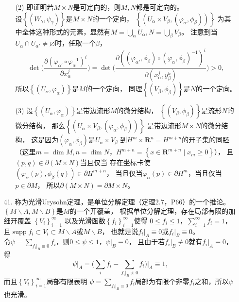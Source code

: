 \begin{itemize}
\begin{enumerate}
    \item[(2)] 即证明若$M\times N$是可定向的，则$M,N$都是可定向的。
    \\
    设$\left\{(W_\gamma,\psi_\gamma)\right\}$是$M\times N$的一个定向，
    $\left\{(U_\alpha\times V_\beta,(\varphi_\alpha,\phi_\beta))\right\}$
    为其中全体这种形式的元素，显然有$M=
    \bigcup\limits_{\alpha}U_\alpha,N=\bigcup\limits_{\beta}V_\beta$。
    注意到当$U_\alpha\cap U_{\alpha'}\neq\varnothing$时，任取一个$\beta$，
    $$\det\Big(\frac{\partial(\varphi_{\alpha'}
    \circ\varphi_\alpha^{-1})^{i}}{\partial x_{\alpha}^j}\Big)
    =\det\Big(\frac{\partial((\varphi_{\alpha'},\phi_\beta)
    \circ(\varphi_\alpha,\phi_\beta)^{-1})^{i}}
    {\partial(x_\alpha^j,y_\beta^k)}\Big)>0,$$
    所以$\left\{(U_\alpha,\varphi_\alpha)\right\}$是$M$的一个定向，
    同理$\left\{(V_\beta,\phi_\beta)\right\}$是$N$的一个定向。
    
    \item[(3)] 设$\left\{(U_\alpha,\varphi_\alpha)\right\}$是带边流形$M$的微分结构，
    $\left\{(V_\beta,\phi_\beta)\right\}$是流形$N$的微分结构，
    那么$\left\{(U_\alpha\times V_\beta,(\varphi_\alpha,\phi_\beta))\right\}$
    是带边流形$M\times N$的微分结构，
    这是因为$(\varphi_\alpha,\phi_\beta)$是$U_\alpha\times V_\beta$
    到$H^m\times\mathbf{R}^n=H^{m+n}$的开子集的同胚
    （这里$m=\dim M,n=\dim N$，$H^{m+n}=\left\{x\in\mathbf{R}^{m+n}\mid x_m\geq0\right\}$），
    且$(p,q)\in\partial(M\times N)$当且仅当
    存在坐标卡使$(\varphi_\alpha(p),\phi_\beta(q))\in\partial H^{m+n}$，
    当且仅当$\varphi_\alpha(p)\in\partial H^m$，当且仅当$p\in\partial M$，
    所以$\partial(M\times N)= \partial M\times N$。
    \end{enumerate}

    \item[41.]
    称为光滑Urysohn定理，是单位分解定理（定理2.7，P66）的一个推论。
    \\
    $\left\{M\backslash A,M\backslash B\right\}$是$M$的一个开覆盖，
    根据单位分解定理，存在局部有限的加细开覆盖
    $\left\{V_i\right\}_{i=1}^\infty$
    以及光滑函数$\left\{f_i\right\}_{i=1}^\infty$使得
    $0\leq f_i\leq1$，$\sum\limits_{i=1}^\infty f_i=1$，
    且$\operatorname{supp}f_i\subset V_i\subset M\backslash A$或$M\backslash B$，
    也就是说$f_i|_A\equiv0$或$f_i|_B\equiv0$。
    \\
    令$\psi=\sum\limits_{f_i|_B\equiv0}f_i$，则$0\leq\psi\leq1$，$\psi|_B\equiv0$，
    且由于若$f_i|_B\not\equiv0$就有$f_i|_A\equiv0$，
    得
    \[
    \psi|_A=\Big(\sum_i f_i-\sum_{f_i|_B\not\equiv0}f_i\Big)\Big|_A\equiv1,
    \]
    而且$\left\{V_i\right\}_{i=1}^\infty$局部有限表明
    $\psi=\sum\limits_{f_i|_B\equiv0}f_i$局部为有限个非零$f_i$之和，所以$\psi$也光滑。
\end{itemize}